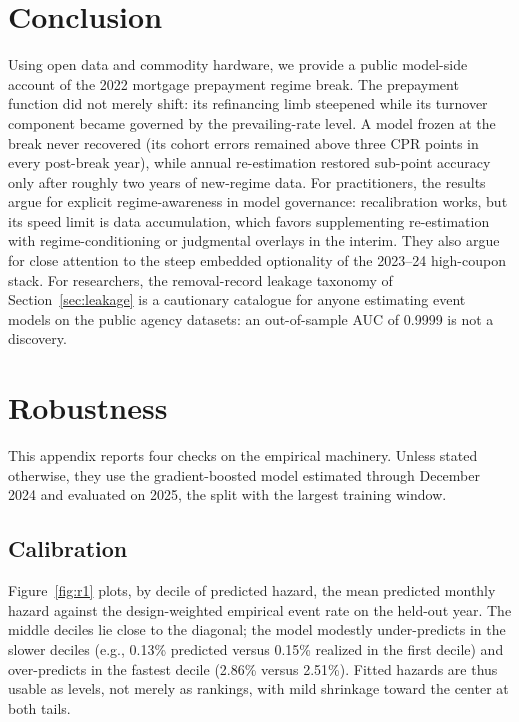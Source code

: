 \documentclass[11pt]{article}
\begin{document}
\section{Conclusion}
\label{sec:conclusion}

Using open data and commodity hardware, we provide a public model-side account of the
2022 mortgage prepayment regime break. The prepayment function did not merely shift: its
refinancing limb steepened while its turnover component became governed by the prevailing-rate
level. A model frozen at the break never recovered (its cohort errors remained above three CPR
points in every post-break year), while annual re-estimation restored sub-point accuracy only
after roughly two years of new-regime data. For practitioners, the results argue for explicit
regime-awareness in model governance: recalibration works, but its speed limit is data
accumulation, which favors supplementing re-estimation with regime-conditioning or judgmental
overlays in the interim. They also argue for close attention to the steep embedded optionality
of the 2023--24 high-coupon stack. For researchers, the removal-record leakage taxonomy of
Section~\ref{sec:leakage} is a cautionary catalogue for anyone estimating event models on the
public agency datasets: an out-of-sample AUC of 0.9999 is not a discovery.




\appendix

\section{Robustness}
\label{app:robustness}

This appendix reports four checks on the empirical machinery. Unless stated otherwise, they use
the gradient-boosted model estimated through December 2024 and evaluated on 2025, the split with
the largest training window.

\subsection{Calibration}

Figure~\ref{fig:r1} plots, by decile of predicted hazard, the mean predicted monthly hazard
against the design-weighted empirical event rate on the held-out year. The middle deciles lie
close to the diagonal; the model modestly under-predicts in the slower deciles (e.g., 0.13\%
predicted versus 0.15\% realized in the first decile) and over-predicts in the fastest decile
(2.86\% versus 2.51\%). Fitted hazards are thus usable as levels, not merely as rankings, with
mild shrinkage toward the center at both tails.
\end{document}
